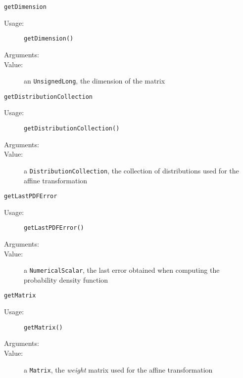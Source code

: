 \begin{description}
\begin{description}
  \item \texttt{getDimension}
    \begin{description}
    \item[Usage:]  \texttt{getDimension()}
    \item[Arguments:]  \strut
    \item[Value:] an \texttt{UnsignedLong}, the dimension of the matrix
    \end{description}

  \item \texttt{getDistributionCollection}
    \begin{description}
    \item[Usage:]  \texttt{getDistributionCollection()}
    \item[Arguments:]  \strut
    \item[Value:] a \texttt{DistributionCollection}, the collection of distributions used for the affine transformation
    \end{description}

  \item \texttt{getLastPDFError}
    \begin{description}
    \item[Usage:]  \texttt{getLastPDFError()}
    \item[Arguments:]  \strut
    \item[Value:] a \texttt{NumericalScalar}, the last error obtained when computing the probability density function
    \end{description}

  \item \texttt{getMatrix}
    \begin{description}
    \item[Usage:]  \texttt{getMatrix()}
    \item[Arguments:]  \strut
    \item[Value:] a \texttt{Matrix}, the \emph{weight} matrix used for the affine transformation
    \end{description}


\end{description}
\end{description}
